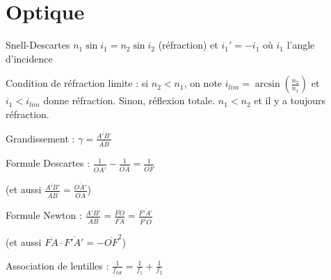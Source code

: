 \documentclass[a4paper,12pt]{book}
\begin{document}
\newpage
\section{Optique}
Snell-Descartes $n_1\sin i_1 = n_2\sin i_2$ (réfraction) et $i_1'=-i_1$ où $i_1$ l'angle d'incidence
\par Condition de réfraction limite : si $n_2<n_1$, on note $i_{lim} =\arcsin\left(\frac{n_2}{n_1}\right)$ et $i_1<i_{lim}$ donne réfraction. Sinon, réflexion totale. $n_1<n_2$ et il y a toujours réfraction.
\par Grandissement : $\gamma = \frac{\overline{A'B'}}{\overline{AB}}$
\par Formule Descartes : $\frac{1}{\overline{OA'}}-\frac{1}{\overline{OA}}=\frac{1}{\overline{OF}}$ 
\par (et aussi $\frac{\overline{A'B'}}{\overline{AB}}=\frac{\overline{OA'}}{\overline{OA}}$)
\par Formule Newton : $\frac{\overline{A'B'}}{\overline{AB}}=\frac{\overline{FO}}{\overline{FA}}=\frac{\overline{F'A'}}{\overline{F'O}}$
\par (et aussi $\overline{FA}\cdot\overline{F'A'}=-\overline{OF}^2$)
\par Association de lentilles : $\frac{1}{f_{tot}}=\frac{1}{f_1}+\frac{1}{f_2}$


\newpage
\end{document}
